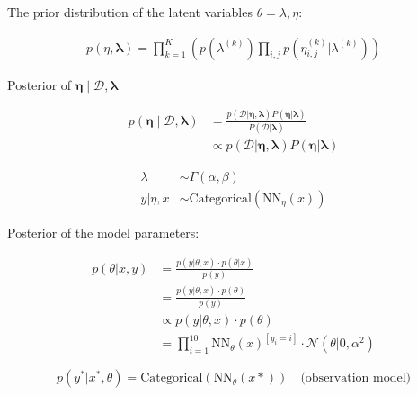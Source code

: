 The prior distribution of the latent variables $\theta = \lambda, \eta$: 

\begin{align*}
    p(\eta, \bm \lambda) =  \prod_{k=1}^K \left( p(\lambda^{(k)}) \prod_{i,j} p(\eta_{i,j}^{(k)}|\lambda^{(k)})\right)
\end{align*}


Posterior of $\bm \eta \mid \mathcal D, \bm \lambda$

\begin{align*}
    p(\bm \eta \mid \mathcal D,\bm \lambda) &=
    \frac
    {p(\mathcal D|\bm \eta,\bm \lambda)P(\bm \eta | \bm \lambda)}
    {P(\mathcal D|\bm \lambda)} \\
    &\propto p(\mathcal D|\bm \eta,\bm \lambda)P(\bm \eta | \bm \lambda)
\end{align*}


\begin{align*}
    \lambda &\sim \Gamma (\alpha, \beta)\\
    y | \eta, x &\sim \text{Categorical}(\text{NN}_\eta(x))
\end{align*}

Posterior of the model parameters:
    
\begin{align*}
    p(\theta | x, y) &= \frac{p(y |\theta, x) \cdot p(\theta|x)}{p(y) } \\
                     &= \frac{p(y |\theta, x) \cdot p(\theta)}{p(y) } \\
                     &\propto p(y |\theta, x) \cdot p(\theta) \\
                     &=\prod_{i=1}^{10}\text{NN}_\theta(x)^{[ y_i = i]} \cdot \mathcal{N}(\theta | 0, \alpha^2)
\end{align*}

$$
p(y^\ast | x^\ast, \theta ) = \text{Categorical}(\text{NN}_\theta(x\ast)) \quad \text{(observation model)}
$$
